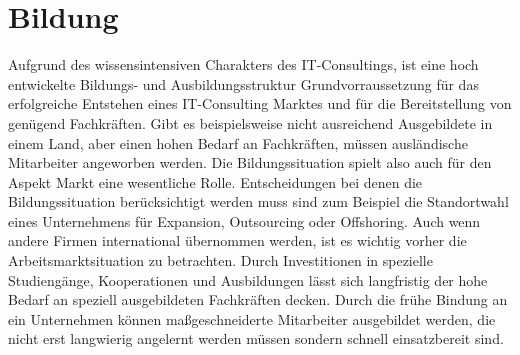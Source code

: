 


\chapter{Bildung}
Aufgrund des wissensintensiven Charakters des IT-Consultings, ist eine hoch entwickelte Bildungs- und Ausbildungsstruktur Grundvorraussetzung für das erfolgreiche Entstehen eines IT-Consulting Marktes und für die Bereitstellung von genügend Fachkräften.
Gibt es beispielsweise nicht ausreichend Ausgebildete in einem Land, aber einen hohen Bedarf an Fachkräften, müssen ausländische Mitarbeiter angeworben werden. Die Bildungssituation spielt also auch für den Aspekt Markt eine wesentliche Rolle.
Entscheidungen bei denen die Bildungssituation berücksichtigt werden muss sind zum Beispiel die Standortwahl eines Unternehmens für Expansion, Outsourcing oder Offshoring. Auch wenn andere Firmen international übernommen werden, ist es wichtig vorher die Arbeitsmarktsituation zu betrachten. Durch Investitionen in spezielle Studiengänge, Kooperationen und Ausbildungen lässt sich langfristig der hohe Bedarf an speziell ausgebildeten Fachkräften decken. Durch die frühe Bindung an ein Unternehmen können maßgeschneiderte Mitarbeiter ausgebildet werden, die nicht erst langwierig angelernt werden müssen sondern schnell einsatzbereit sind.

